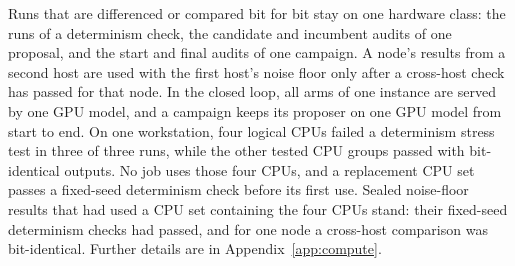Runs that are differenced or compared bit for bit stay on one hardware class: the runs of a determinism check, the candidate and incumbent audits of one proposal, and the start and final audits of one campaign. A node's results from a second host are used with the first host's noise floor only after a cross-host check has passed for that node. In the closed loop, all arms of one instance are served by one GPU model, and a campaign keeps its proposer on one GPU model from start to end. On one workstation, four logical CPUs failed a determinism stress test in three of three runs, while the other tested CPU groups passed with bit-identical outputs. No job uses those four CPUs, and a replacement CPU set passes a fixed-seed determinism check before its first use. Sealed noise-floor results that had used a CPU set containing the four CPUs stand: their fixed-seed determinism checks had passed, and for one node a cross-host comparison was bit-identical.  Further details are in Appendix~\ref{app:compute}.
